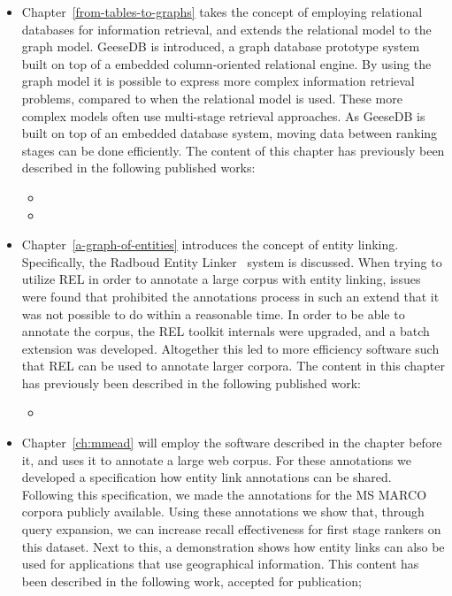 \begin{itemize}
\item Chapter~\ref{from-tables-to-graphs} takes the concept of employing relational databases for information retrieval, and extends the relational model to the graph model. GeeseDB is introduced, a graph database prototype system built on top of a embedded column-oriented relational engine. By using the graph model it is possible to express more complex information retrieval problems, compared to when the relational model is used. These more complex models often use multi-stage retrieval approaches. As GeeseDB is built on top of an embedded database system, moving data between ranking stages can be done efficiently. The content of this chapter has previously been described in the following published works:

{
	\scriptsize
	\begin{itemize}
		\item {}
		\item {}
	\end{itemize}
}

\item Chapter~\ref{a-graph-of-entities} introduces the concept of entity linking. Specifically, the Radboud Entity Linker~\citep{rel} system is discussed. When trying to utilize REL in order to annotate a large corpus with entity linking, issues were found that prohibited the annotations process in such an extend that it was not possible to do within a reasonable time. In order to be able to annotate the corpus, the REL toolkit internals were upgraded, and a batch extension was developed. Altogether this led to more efficiency software such that REL can be used to annotate larger corpora. The content in this chapter has previously been described in the following published work: 

{
	\scriptsize
	\begin{itemize}
		\item {}
	\end{itemize}
}

\item Chapter~\ref{ch:mmead} will employ the software described in the chapter before it, and uses it to annotate a large web corpus. For these annotations we developed a specification how entity link annotations can be shared. Following this specification, we made the annotations for the MS MARCO~\citep{msmarco} corpora publicly available. Using these annotations we show that, through query expansion, we can increase recall effectiveness for first stage rankers on this dataset. Next to this, a demonstration shows how entity links can also be used for applications that use geographical information. 
This content has been described in the following work, accepted for publication; 


\end{itemize}
